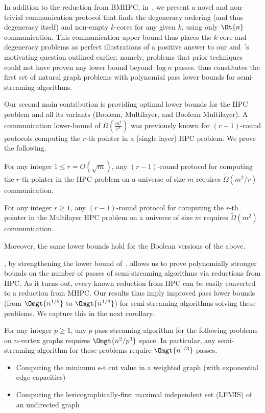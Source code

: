 In addition to the reduction from BMHPC, in~, we present a novel and non-trivial communication protocol that finds the degeneracy ordering (and thus degeneracy itself) and non-empty $k$-cores for any given $k$, using only $\Ot{n}$ communication. This communication upper bound thus places the $k$-core and degeneracy problems as perfect illustrations of a positive answer to our and~\cite{AssadiCK19}'s motivating question outlined earlier: namely, problems 
that prior techniques could not have proven any lower bound beyond $\log{n}$ passes. 
 thus constitutes the first set of natural graph problems with polynomial pass lower bounds for semi-streaming algorithms. 

\medskip

Our second main contribution is providing optimal lower bounds for the HPC problem and all its variants (Boolean, Multilayer, and Boolean Multilayer). A communication lower-bound of $\Omega(\frac{m^2}{r^2})$ was previously known for $(r-1)$-round protocols computing the $r$-th pointer in a (single layer) HPC problem. We prove the following.

\begin{result}\label{res:hpc-lb}
	For any integer $1 \le r = O(\sqrt m)$, any $(r-1)$-round protocol for computing the $r$-th pointer in the HPC problem on a universe of size $m$ requires $\tilde \Omega({m^2}/r)$ communication. 

\medskip
\noindent
 For any integer $r \geq 1$, any $(r-1)$-round protocol for computing the $r$-th pointer in the Multilayer HPC problem on a universe of size $m$ requires $\tilde \Omega(m^2)$ communication. 
 
	\medskip
	\noindent
	Moreover, the same lower bounds hold for the Boolean versions of the above. 
\end{result}

, by strengthening the lower bound of~\cite{AssadiCK19}, allows us to prove polynomially stronger bounds on the number of passes of semi-streaming algorithms via reductions from HPC. As it turns out, every known reduction from HPC \cite{AssadiCK19} can be easily converted to a reduction from MHPC. Our results thus imply improved pass lower bounds (from $\Omgt{n^{1/5}}$ to $\Omgt{n^{1/3}}$)  for semi-streaming algorithms solving these problems. We capture this in the next corollary.

\begin{corollary}\label{cor:lfmis-mincut}
For any integer $p \geq 1$, any $p$-pass streaming algorithm for the following problems on $n$-vertex graphs requires $\Omgt{n^2/p^3}$ space. In particular, any semi-streaming algorithm for these problems require $\Omgt{n^{1/3}}$ passes.
\begin{itemize}
    \item Computing the minimum s-t cut value in a weighted graph (with exponential edge capacities)
    \item Computing the lexicographically-first maximal independent set (LFMIS) of an undirected graph
\end{itemize}
\end{corollary}

